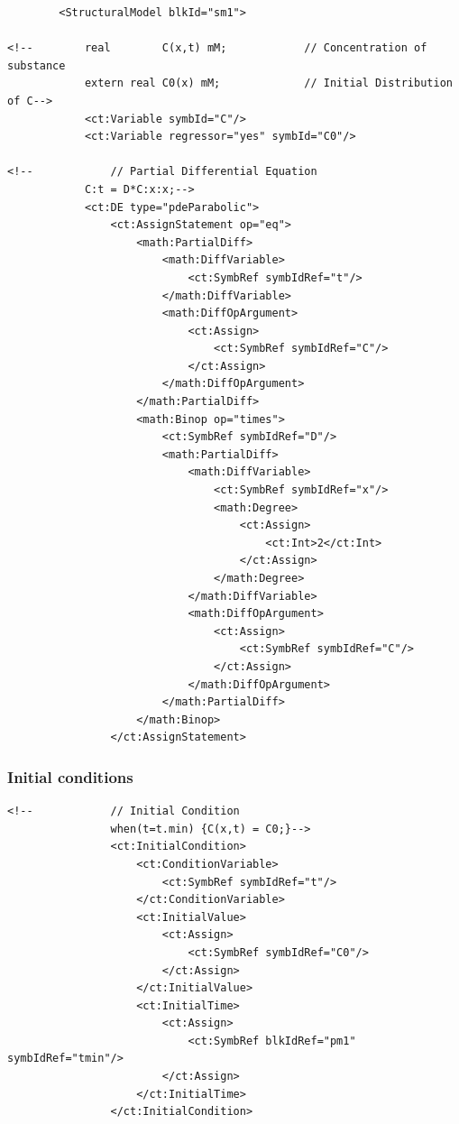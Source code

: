 \lstset{language=XML}
\begin{lstlisting}
        <StructuralModel blkId="sm1">

<!--        real        C(x,t) mM;            // Concentration of substance
            extern real C0(x) mM;             // Initial Distribution of C-->
            <ct:Variable symbId="C"/>
            <ct:Variable regressor="yes" symbId="C0"/>
            
<!--            // Partial Differential Equation
            C:t = D*C:x:x;-->
            <ct:DE type="pdeParabolic">
                <ct:AssignStatement op="eq">
                    <math:PartialDiff>
                        <math:DiffVariable>
                            <ct:SymbRef symbIdRef="t"/>
                        </math:DiffVariable>
                        <math:DiffOpArgument>
                            <ct:Assign>
                                <ct:SymbRef symbIdRef="C"/>
                            </ct:Assign>
                        </math:DiffOpArgument>
                    </math:PartialDiff>
                    <math:Binop op="times">
                        <ct:SymbRef symbIdRef="D"/>
                        <math:PartialDiff>
                            <math:DiffVariable>
                                <ct:SymbRef symbIdRef="x"/>
                                <math:Degree>
                                    <ct:Assign>
                                        <ct:Int>2</ct:Int>
                                    </ct:Assign>
                                </math:Degree>
                            </math:DiffVariable>
                            <math:DiffOpArgument>
                                <ct:Assign>
                                    <ct:SymbRef symbIdRef="C"/>
                                </ct:Assign>
                            </math:DiffOpArgument>
                        </math:PartialDiff>
                    </math:Binop>
                </ct:AssignStatement>
\end{lstlisting}


\subsubsection*{Initial conditions}

\lstset{language=XML}
\begin{lstlisting}
<!--            // Initial Condition
                when(t=t.min) {C(x,t) = C0;}-->
                <ct:InitialCondition>
                    <ct:ConditionVariable>
                        <ct:SymbRef symbIdRef="t"/>
                    </ct:ConditionVariable>
                    <ct:InitialValue>
                        <ct:Assign>
                            <ct:SymbRef symbIdRef="C0"/>
                        </ct:Assign>
                    </ct:InitialValue>
                    <ct:InitialTime>
                        <ct:Assign>
                            <ct:SymbRef blkIdRef="pm1" symbIdRef="tmin"/>
                        </ct:Assign>
                    </ct:InitialTime>
                </ct:InitialCondition>
\end{lstlisting}


